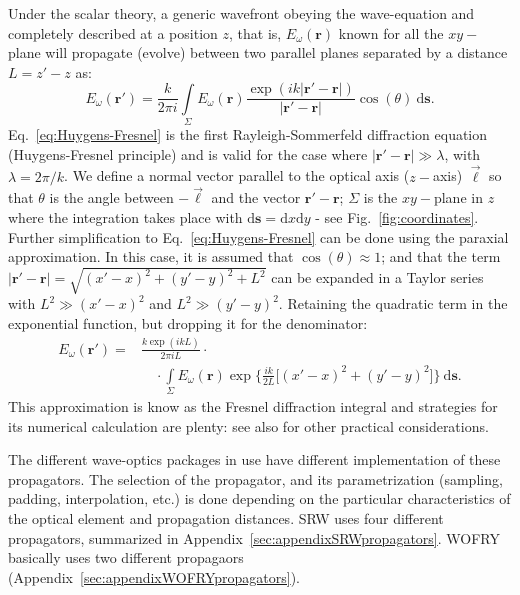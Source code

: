 \documentclass{iucr}              %
\begin{document}
Under the scalar theory, a generic wavefront obeying the wave-equation and completely described at a position $z$, that is, $E_\omega(\textbf{r})$ known for all the $xy-$plane will propagate (evolve) between two parallel planes separated by a distance $L=z'-z$ as: 
\begin{equation}\label{eq:Huygens-Fresnel}
    E_\omega(\textbf{r}') = \frac{k}{2\pi i}\int\limits_{\Sigma}{E_\omega(\textbf{r})\frac{\exp{(ik\vert\textbf{r}' - \textbf{r}\vert)}}{\vert\textbf{r}' - \textbf{r}\vert}\cos{(\theta)}~\mathrm{d}\textbf{s}}.
\end{equation}
Eq.~\ref{eq:Huygens-Fresnel} is the first Rayleigh-Sommerfeld diffraction equation (Huygens-Fresnel principle) and is valid for the case where $\vert\textbf{r}' - \textbf{r}\vert\gg\lambda$, with $\lambda=2\pi \big/ k$. We define a normal vector parallel to the optical axis ($z-$axis) $\vec{\ell}$ so that $\theta$ is the angle between $-\vec{\ell}$ and the vector $\textbf{r}'-\textbf{r}$; $\Sigma$ is the $xy-$plane in $z$ where the integration takes place with $\mathrm{d}\textbf{s}=\mathrm{d}x\mathrm{d}y$ - see Fig.~\ref{fig:coordinates}. Further simplification to Eq.~\ref{eq:Huygens-Fresnel} can be done using the paraxial approximation. In this case, it is assumed that $\cos{(\theta)}\approx1$; and that the term $\vert\textbf{r}' - \textbf{r}\vert=\sqrt{(x'-x)^2 + (y'-y)^2 + L^2}$ can be expanded in a Taylor series with $L^2\gg(x'-x)^2$ and $L^2\gg(y'-y)^2$. Retaining the quadratic term in the exponential function, but dropping it for the denominator:
\begin{equation}\label{eq:Fresnel}
\begin{split}
    E_\omega(\textbf{r}') = &\frac{k\exp{(ikL)}}{2\pi i L}\cdot \\
    &\quad\cdot\int\limits_{\Sigma}{E_\omega(\textbf{r})\exp{\bigg\{ \frac{ik}{2L}\big[ (x'-x)^2 + (y'-y)^2 \big]\bigg\}}~\mathrm{d}\textbf{s}}.
\end{split}
\end{equation}
This approximation is know as the Fresnel diffraction integral and strategies for its numerical calculation are plenty: \cite{Kelly2014,Goodman2017} see also \cite{Rees87, Stern2004, Zhang2020} for other practical considerations.

The different wave-optics packages in use have different implementation of these propagators. The selection of the propagator, and its parametrization (sampling, padding, interpolation, etc.) is done depending on the particular characteristics of the optical element and propagation distances. SRW uses four different propagators, summarized in Appendix~\ref{sec:appendixSRWpropagators}. WOFRY basically uses two different propagaors (Appendix~\ref{sec:appendixWOFRYpropagators}).   
\end{document}
